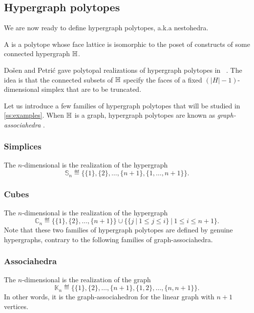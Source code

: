 
\subsection{Hypergraph polytopes}
\label{ss:hypergraph-polytopes}

We are now ready to define hypergraph polytopes, a.k.a nestohedra.

\begin{definition}
    A  is a polytope whose face lattice is isomorphic to the poset of constructs of some connected hypergraph ${\mathbb H}$.
\end{definition}

Do\v sen and Petri\'c gave polytopal realizations of hypergraph polytopes in ~\cite{DP-HP}.
The idea is that the connected subsets of ${\mathbb H}$ specify the faces of a fixed $(|H|-1)$-dimensional simplex that are to be truncated.

Let us introduce a few families of hypergraph polytopes that will be studied in \cref{ss:examples}.
When ${\mathbb H}$ is a graph, hypergraph polytopes are known as \emph{graph-associahedra} \cite{CD-CCGA}.

\subsubsection{Simplices}
The $n$-dimensional  is the realization of the hypergraph 
$$\mathbb{S}_n\eqdef  \{\{1\},\{2\},\ldots,\{n+1\},\{1,\ldots,n+1\}\}.$$

\subsubsection{Cubes}
The $n$-dimensional  is the realization of the hypergraph
$$\mathbb{C}_n\eqdef  
\{\{1\},\{2\},\ldots,\{n+1\}\}\cup\{\{j \ | \ 1 \leq j \leq i \} \ | \ 1 \leq i \leq n+1\}.$$
Note that these two families of hypergraph polytopes are defined by genuine hypergraphs, contrary to the following families of graph-associahedra.

\subsubsection{Associahedra}
The $n$-dimensional  is the realization of the graph 
$$\mathbb{K}_n\eqdef  \{\{1\},\{2\},\ldots,\{n+1\},\{1,2\},\ldots,\{n,n+1\}\}.$$
In other words, it is the graph-associahedron for the linear graph with $n+1$ vertices.

